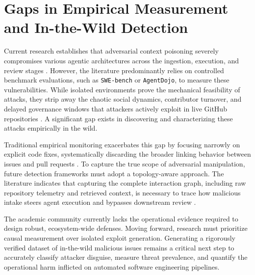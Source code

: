 \documentclass[11pt, a4paper]{article}
\begin{document}
\clearpage
\section{\textbf{Gaps in Empirical Measurement and In-the-Wild Detection}}

Current research establishes that adversarial context poisoning severely compromises various agentic architectures across the ingestion, execution, and review stages \citep{adv_bug_reports_2026,your_ai_my_shell_2025,openhands_2025}. However, the literature predominantly relies on controlled benchmark evaluations, such as \texttt{SWE-bench} or \texttt{AgentDojo}, to measure these vulnerabilities. While isolated environments prove the mechanical feasibility of attacks, they strip away the chaotic social dynamics, contributor turnover, and delayed governance windows that attackers actively exploit in live GitHub repositories \citep{good_first_issues_2020,msr_user_ask_2023}. A significant gap exists in discovering and characterizing these attacks empirically in the wild.

Traditional empirical monitoring exacerbates this gap by focusing narrowly on explicit code fixes, systematically discarding the broader linking behavior between issues and pull requests \citep{pr_graph_topologies_2024}. To capture the true scope of adversarial manipulation, future detection frameworks must adopt a topology-aware approach. The literature indicates that capturing the complete interaction graph, including raw repository telemetry and retrieved context, is necessary to trace how malicious intake steers agent execution and bypasses downstream review \citep{your_ai_my_shell_2025,agentic_coding_github_2026}. 

The academic community currently lacks the operational evidence required to design robust, ecosystem-wide defenses. Moving forward, research must prioritize causal measurement over isolated exploit generation. Generating a rigorously verified dataset of in-the-wild malicious issues remains a critical next step to accurately classify attacker disguise, measure threat prevalence, and quantify the operational harm inflicted on automated software engineering pipelines.
\end{document}
